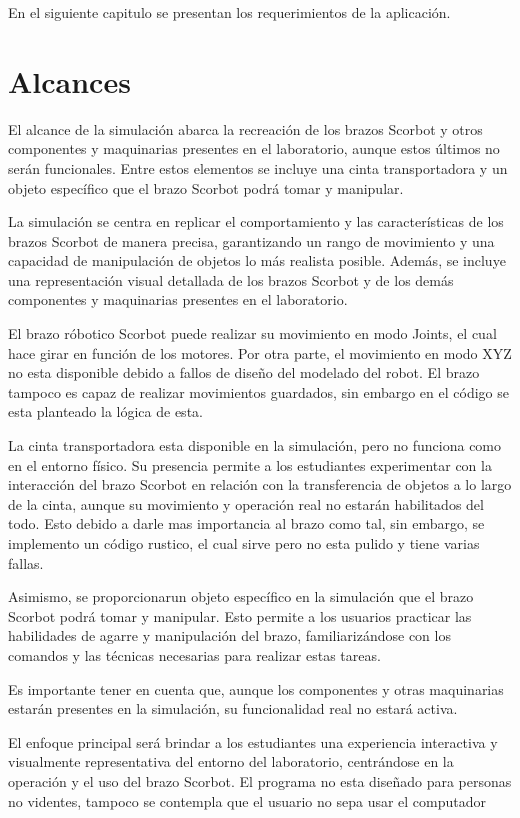 En el siguiente capitulo se presentan los requerimientos de la aplicación.

\section{Alcances}
El alcance de la simulación abarca la recreación de los brazos Scorbot y otros componentes y maquinarias presentes en el laboratorio, aunque estos últimos no serán funcionales. Entre estos elementos se incluye una cinta transportadora y un objeto específico que el brazo Scorbot podrá tomar y manipular.

La simulación se centra en replicar el comportamiento y las características de los brazos Scorbot de manera precisa, garantizando un rango de movimiento y una capacidad de manipulación de objetos lo más realista posible. Además, se incluye una representación visual detallada de los brazos Scorbot y de los demás componentes y maquinarias presentes en el laboratorio.

El brazo róbotico Scorbot puede realizar su movimiento en modo Joints, el cual hace girar en función de los motores. Por otra parte, el movimiento en modo XYZ no esta disponible debido a fallos de diseño del modelado del robot. El brazo tampoco es capaz de realizar movimientos guardados, sin embargo en el código se esta planteado la lógica de esta.

La cinta transportadora esta disponible en la simulación, pero no funciona como en el entorno físico. Su presencia permite a los estudiantes experimentar con la interacción del brazo Scorbot en relación con la transferencia de objetos a lo largo de la cinta, aunque su movimiento y operación real no estarán habilitados del todo. Esto debido a darle mas importancia al brazo como tal, sin embargo, se implemento un código rustico, el cual sirve pero no esta pulido y tiene varias fallas.

Asimismo, se proporcionarun objeto específico en la simulación que el brazo Scorbot podrá tomar y manipular. Esto permite a los usuarios practicar las habilidades de agarre y manipulación del brazo, familiarizándose con los comandos y las técnicas necesarias para realizar estas tareas.

Es importante tener en cuenta que, aunque los componentes y otras maquinarias estarán presentes en la simulación, su funcionalidad real no estará activa. 

El enfoque principal será brindar a los estudiantes una experiencia interactiva y visualmente representativa del entorno del laboratorio, centrándose en la operación y el uso del brazo Scorbot. El programa no esta diseñado para personas no videntes, tampoco se contempla que el usuario no sepa usar el computador

